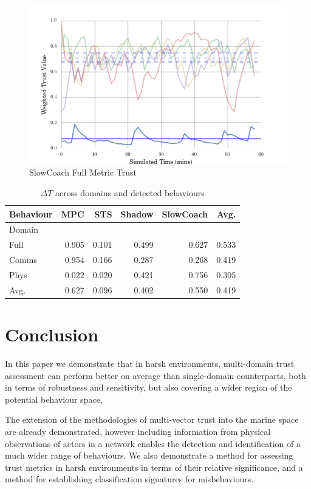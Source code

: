 \documentclass{aamas2016}
\begin{document}
\begin{figure}[h]
	\centering
  \includegraphics[width=\linewidth]{best_full_run_SlowCoach}
	\caption{SlowCoach Full Metric Trust}
	\label{fig:full_slowcoach}
\end{figure}


\begin{table}
\centering
\caption{$\Delta T$ across domains and detected behaviours}
\begin{tabular}{|l|r|r|r|r|r|}
\hline
Behaviour &       MPC &       STS &    Shadow & SlowCoach & Avg.\\
\hline
Domain &           &           &           &           &\\
Full   &  0.905 &  0.101 &  0.499 &  0.627 & 0.533\\
Comms  &  0.954 &  0.166 &  0.287 &  0.268 & 0.419 \\
Phys   &  0.022 &  0.020 &  0.421 &  0.756 & 0.305\\
\hline
Avg.   &  0.627 &  0.096 &  0.402 &  0.550 &  0.419 \\
\hline
\end{tabular}
\label{tab:domain_deltas}
\end{table}

\section{Conclusion}
In this paper we demonstrate that in harsh environments, multi-domain trust assessment can perform better on average than single-domain counterparts, both in terms of robustness and sensitivity, but also covering a wider region of the potential behaviour space, 

The extension of the methodologies of multi-vector trust into the marine space are already demonstrated, however including information from physical observations of actors in a network enables the detection and identification of a much wider range of behaviours.
We also demonstrate a method for assessing trust metrics in harsh environments in terms of their relative significance, and a method for establishing classification signatures for misbehaviours.
\end{document}
